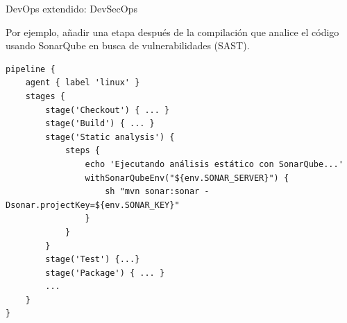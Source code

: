 \documentclass{beamer}
\begin{document}
\begin{frame}[fragile]{DevOps extendido: DevSecOps}

Por ejemplo, añadir una etapa después de la compilación que analice el código usando SonarQube en busca de vulnerabilidades (SAST).
\begin{verbatim}
pipeline {
    agent { label 'linux' }          
    stages {
        stage('Checkout') { ... }
        stage('Build') { ... }
        stage('Static analysis') {
            steps {
                echo 'Ejecutando análisis estático con SonarQube...'
                withSonarQubeEnv("${env.SONAR_SERVER}") {
                    sh "mvn sonar:sonar -Dsonar.projectKey=${env.SONAR_KEY}"
                }
            }
        }
        stage('Test') {...}
        stage('Package') { ... }
        ...
    }
}   
\end{verbatim}
    
\end{frame}
\end{document}
